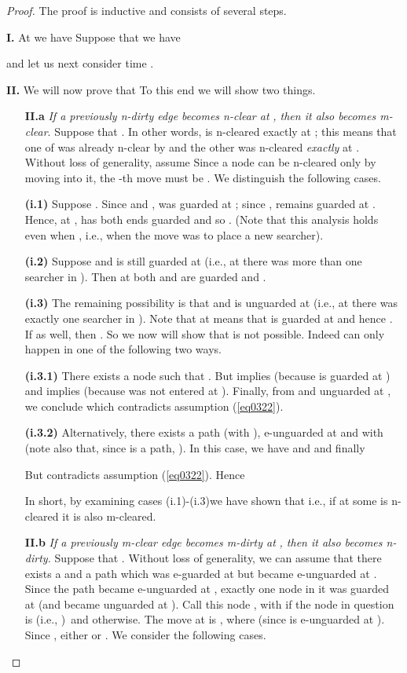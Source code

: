\documentclass[11pt]{article}\usepackage{amsmath}
\begin{document}
\begin{proof}
The proof is inductive and consists of several steps. \noindent

\noindent\textbf{I.} At  we have
Suppose that we have

and let us next consider time . \noindent

\noindent\textbf{II.} We will now prove that
To this end we will show two things.

\begin{enumerate}
\item[\textbf{II.a}] \emph{If a previously n-dirty edge becomes n-clear at
}\emph{, then it also becomes m-clear}. Suppose that . In other words,
 is n-cleared exactly at ; this means that one of  was already
n-clear by  and the other was n-cleared \emph{exactly} at . Without
loss of generality, assume
Since a node can be n-cleared only by moving into it, the -th move must be . We distinguish the following cases.

\textbf{(i.1)} Suppose . Since  and
,  was guarded at ; since ,
 remains guarded at . Hence, at ,  has both ends guarded and
so . (Note that this analysis holds even
when , i.e., when the move was to place a new searcher).

\textbf{(i.2)} Suppose  and  is still guarded at  (i.e., at 
there was more than one searcher in ). Then at  both  and  are
guarded and .

\textbf{(i.3)} The remaining possibility is that  and  is unguarded at
 (i.e., at  there was exactly one searcher in ). Note that
 at  means that  is guarded at  and hence . If  as well,
then . So we now will show that  is not possible. Indeed  can only happen in one of the following two ways.

\textbf{(i.3.1)} There exists a node  such that . But  implies  (because  is guarded at ) and  implies 
(because  was not entered at ). Finally, from  and  unguarded at , we conclude  which contradicts assumption (\ref{eq0322}).

\textbf{(i.3.2)} Alternatively, there exists a path  (with
), e-unguarded at  and with  (note also that, since
 is a path, ). In this case, we have
and
and finally

But  contradicts assumption (\ref{eq0322}). Hence  \medskip

\qquad In short, by examining cases (i.1)-(i.3)we have shown that
i.e., if at  some  is n-cleared it is also m-cleared.

\item[\textbf{II.b}] \emph{If a previously m-clear edge becomes m-dirty at
}\emph{, then it also becomes n-dirty.} Suppose that . Without loss of
generality, we can assume that there exists a  and a path
 which was e-guarded at  but became e-unguarded at .
Since the path became e-unguarded at , exactly one node in it was guarded
at  (and became unguarded at ). Call this node ,
with  if the node in question is  (i.e., )\ and
 otherwise. The move at 
is , where  (since  is e-unguarded at ).
Since  , either  or . We consider the following cases.


\end{enumerate}
\end{proof}
\end{document}
